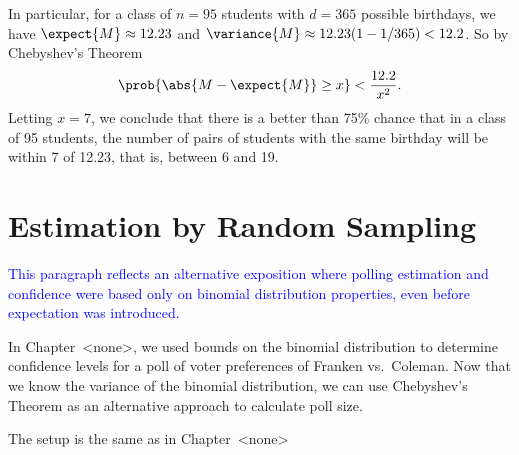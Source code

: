 In particular, for a class of $n= 95$ students with $d=365$ possible
birthdays, we have $\expect{M} \approx 12.23$ and $\variance{M}
\approx 12.23 (1- 1/365) < 12.2$.  So by Chebyshev's Theorem
\[
\prob{\abs{M - \expect{M}} \geq x} < \frac{12.2}{x^2}.
\]
Letting $x=7$, we conclude that there is a better than 75\% chance
that in a class of 95 students, the number of pairs of students with
the same birthday will be within 7 of 12.23, that is, between 6 and 19.



\begin{problems}
\practiceproblems
{}

\classproblems
{}

\homeworkproblems

\examproblems
{}

\end{problems}


\section{Estimation by Random Sampling}\label{randomsampling}

\begin{editingnotes}

\textcolor{blue}{This paragraph reflects an alternative exposition
  where polling estimation and confidence were based only on binomial
  distribution properties, even before expectation was introduced.}

In Chapter~<none>, we used bounds on the binomial distribution to determine
confidence levels for a poll of voter preferences of Franken vs.\ Coleman.
Now that we know the variance of the binomial distribution, we can use
Chebyshev's Theorem as an alternative approach to calculate poll size.

The setup is the same as in Chapter~<none>
\end{editingnotes}

